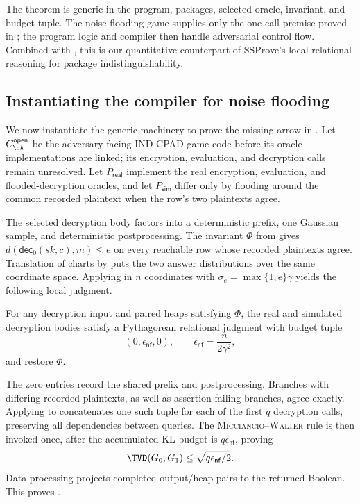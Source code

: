 The theorem is generic in the program, packages, selected oracle, invariant, and budget tuple.
The noise-flooding game supplies only the one-call premise proved in
; the program logic and compiler then handle adversarial
control flow.
Combined with , this is our quantitative counterpart of SSProve's local relational reasoning for package indistinguishability.

\subsection{Instantiating the compiler for noise flooding}
\label{sec:closing-hop}

We now instantiate the generic machinery to prove the missing arrow in
.
Let \(C_{\cA}^{\mathsf{open}}\) be the adversary-facing IND-CPAD game code
before its oracle implementations are linked; its encryption, evaluation, and
decryption calls remain unresolved.
Let \(P_{\mathsf{real}}\) implement the real encryption, evaluation, and
flooded-decryption oracles, and let \(P_{\mathsf{sim}}\) differ only by
flooding around the common recorded plaintext when the row's two plaintexts
agree.

The selected decryption body factors into a deterministic prefix, one Gaussian
sample, and deterministic postprocessing.
The invariant \(\Phi\) from  gives
\(d(\mathsf{dec}_0(sk,c),m)\leq e\) on every reachable row whose recorded
plaintexts agree.
Translation of charts by  puts the two answer distributions
over the same coordinate space.
Applying  in \(n\) coordinates with
\(\sigma_e=\max\{1,e\}\gamma\) yields the following local judgment.

\begin{lemma}
\label{lem:one-call}
For any decryption input and paired heaps satisfying \(\Phi\), the real and
simulated decryption bodies satisfy a Pythagorean relational judgment with
budget tuple
\[
 (0,\epsilon_{\mathsf{nf}},0),
 \qquad
 \epsilon_{\mathsf{nf}}=\frac{n}{2\gamma^2},
\]
and restore \(\Phi\).
\end{lemma}

The zero entries record the shared prefix and postprocessing.
Branches with differing recorded plaintexts, as well as assertion-failing
branches, agree exactly.
Applying  to  concatenates one
such tuple for each of the first \(q\) decryption calls, preserving all
dependencies between queries.
The \textsc{Micciancio--Walter} rule is then invoked once, after the accumulated
KL budget is \(q\epsilon_{\mathsf{nf}}\), proving
\[
 \TVD(G_0,G_1)\leq\sqrt{q\epsilon_{\mathsf{nf}}/2}.
\]
Data processing projects completed output/heap pairs to the returned Boolean.
This proves .

